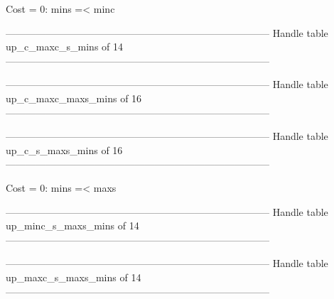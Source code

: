 Cost =  0:  mins =< minc

--------------------------------------------------------------------------------
Handle table up_c_maxc_s_mins of 14
--------------------------------------------------------------------------------


--------------------------------------------------------------------------------
Handle table up_c_maxc_maxs_mins of 16
--------------------------------------------------------------------------------


--------------------------------------------------------------------------------
Handle table up_c_s_maxs_mins of 16
--------------------------------------------------------------------------------

Cost =  0:  mins =< maxs

--------------------------------------------------------------------------------
Handle table up_minc_s_maxs_mins of 14
--------------------------------------------------------------------------------


--------------------------------------------------------------------------------
Handle table up_maxc_s_maxs_mins of 14
--------------------------------------------------------------------------------
